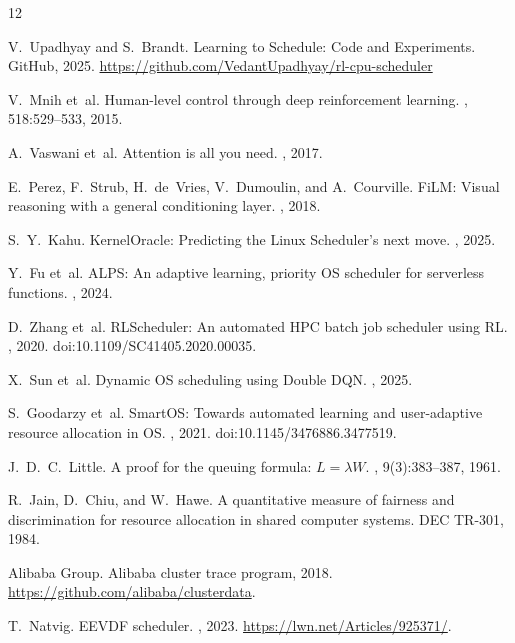 \documentclass[10pt,twocolumn]{article}
\theoremstyle{remark}
\begin{document}

\begin{thebibliography}{12}

  V.~Upadhyay and S.~Brandt.
  \newblock Learning to Schedule: Code and Experiments.
  \newblock GitHub, 2025.
  \newblock \url{https://github.com/VedantUpadhyay/rl-cpu-scheduler}

  V.~Mnih et~al.
  \newblock Human-level control through deep reinforcement learning.
  , 518:529--533, 2015.

  A.~Vaswani et~al.
  \newblock Attention is all you need.
  , 2017.

  E.~Perez, F.~Strub, H.~de~Vries, V.~Dumoulin, and A.~Courville.
  \newblock FiLM: Visual reasoning with a general conditioning layer.
  , 2018.

  S.~Y.~Kahu.
  \newblock KernelOracle: Predicting the Linux Scheduler's next move.
  , 2025.

  Y.~Fu et~al.
  \newblock ALPS: An adaptive learning, priority OS scheduler for
  serverless functions.
  , 2024.

  D.~Zhang et~al.
  \newblock RLScheduler: An automated HPC batch job scheduler using RL.
  , 2020. doi:10.1109/SC41405.2020.00035.

  X.~Sun et~al.
  \newblock Dynamic OS scheduling using Double DQN.
  , 2025.

  S.~Goodarzy et~al.
  \newblock SmartOS: Towards automated learning and user-adaptive
  resource allocation in OS.
  , 2021. doi:10.1145/3476886.3477519.

  J.~D.~C.~Little.
  \newblock A proof for the queuing formula: $L=\lambda W$.
  , 9(3):383--387, 1961.

  R.~Jain, D.~Chiu, and W.~Hawe.
  \newblock A quantitative measure of fairness and discrimination for
  resource allocation in shared computer systems.
  \newblock DEC TR-301, 1984.

  Alibaba Group.
  \newblock Alibaba cluster trace program, 2018.
  \newblock \url{https://github.com/alibaba/clusterdata}.

  T.~Natvig.
  \newblock EEVDF scheduler.
  , 2023.
  \newblock \url{https://lwn.net/Articles/925371/}.

\end{thebibliography}
\end{document}
